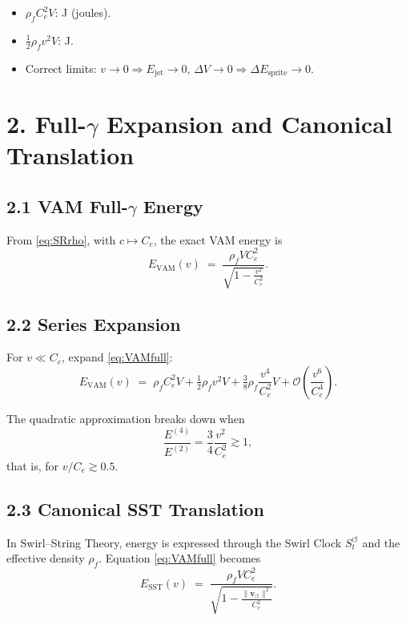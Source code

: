 \documentclass[11pt]{article}
\newcommand{\vnorm}{\lVert \mathbf{v}_{\!\boldsymbol{\circlearrowleft}}\rVert}
\newcommand{\rhof}{\rho_{\!f}}
\newcommand{\Ce}{C_{e}}
\begin{document}
    \begin{itemize}
    \item $\rhof \Ce^2 V$: J (joules).
    \item $\tfrac{1}{2}\rhof v^2 V$: J.
    \item Correct limits: $v\to 0 \Rightarrow E_{\text{jet}}\to 0$,
    $\Delta V \to 0 \Rightarrow \Delta E_{\text{sprite}} \to 0$.
    \end{itemize}

\section*{2. Full-$\gamma$ Expansion and Canonical Translation}

\subsection*{2.1 VAM Full-$\gamma$ Energy}

    From \eqref{eq:SRrho}, with $c\mapsto \Ce$,
    the exact VAM energy is
    \begin{equation}
    E_{\text{VAM}}(v) \;=\;
    \frac{\rhof V \Ce^2}{\sqrt{1 - \frac{v^2}{\Ce^2}}}.
    \label{eq:VAMfull}
    \end{equation}

\subsection*{2.2 Series Expansion}

    For $v \ll \Ce$, expand \eqref{eq:VAMfull}:
    \begin{equation}
    E_{\text{VAM}}(v) \;=\;
    \rhof \Ce^2 V
    + \tfrac{1}{2}\rhof v^2 V
    + \tfrac{3}{8}\rhof \frac{v^4}{\Ce^2} V
    + \mathcal{O}\!\left(\frac{v^6}{\Ce^4}\right).
    \label{eq:VAMseries}
    \end{equation}

    The quadratic approximation breaks down when
    \begin{equation}
    \frac{E^{(4)}}{E^{(2)}}
    = \frac{3}{4}\frac{v^2}{\Ce^2} \gtrsim 1,
    \label{eq:quadbreak}
    \end{equation}
    that is, for $v/\Ce \gtrsim 0.5$.

\subsection*{2.3 Canonical SST Translation}

    In Swirl--String Theory, energy is expressed through the Swirl Clock
    $S_t^{\boldsymbol{\circlearrowleft}}$ and the effective density $\rhof$.
    Equation \eqref{eq:VAMfull} becomes
    \begin{equation}
    E_{\text{SST}}(v) \;=\;
    \frac{\rhof V \Ce^2}
    {\sqrt{1 - \tfrac{\vnorm^2}{\Ce^2}}}.
    \label{eq:SSTfull}
    \end{equation}
\end{document}
